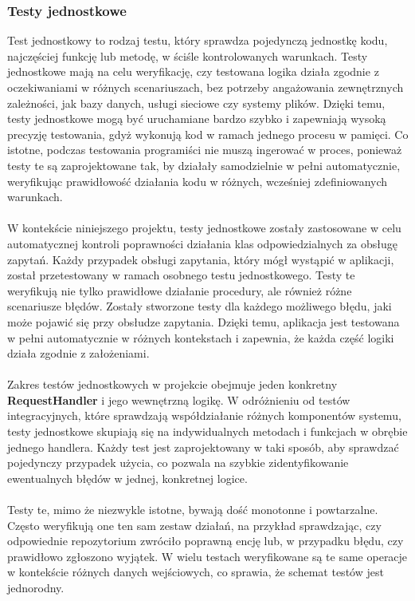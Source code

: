 \documentclass[12pt,a4paper]{article}
\begin{document}
\subsubsection{Testy jednostkowe}
Test jednostkowy to rodzaj testu, który sprawdza pojedynczą jednostkę kodu, najczęściej funkcję lub metodę, w ściśle kontrolowanych warunkach. Testy jednostkowe mają na celu weryfikację, czy testowana logika działa zgodnie z oczekiwaniami w różnych scenariuszach, bez potrzeby angażowania zewnętrznych zależności, jak bazy danych, usługi sieciowe czy systemy plików. Dzięki temu, testy jednostkowe mogą być uruchamiane bardzo szybko i zapewniają wysoką precyzję testowania, gdyż wykonują kod w ramach jednego procesu w pamięci. Co istotne, podczas testowania programiści nie muszą ingerować w proces, ponieważ testy te są zaprojektowane tak, by działały samodzielnie w pełni automatycznie, weryfikując prawidłowość działania kodu w różnych, wcześniej zdefiniowanych warunkach.
\\\\
W kontekście niniejszego projektu, testy jednostkowe zostały zastosowane w celu automatycznej kontroli poprawności działania klas odpowiedzialnych za obsługę zapytań. Każdy przypadek obsługi zapytania, który mógł wystąpić w aplikacji, został przetestowany w ramach osobnego testu jednostkowego. Testy te weryfikują nie tylko prawidłowe działanie procedury, ale również różne scenariusze błędów. Zostały stworzone testy dla każdego możliwego błędu, jaki może pojawić się przy obsłudze zapytania. Dzięki temu, aplikacja jest testowana w pełni automatycznie w różnych kontekstach i zapewnia, że każda część logiki działa zgodnie z założeniami.
\\\\
Zakres testów jednostkowych w projekcie obejmuje jeden konkretny \textbf{RequestHandler} i jego wewnętrzną logikę. W odróżnieniu od testów integracyjnych, które sprawdzają współdziałanie różnych komponentów systemu, testy jednostkowe skupiają się na indywidualnych metodach i funkcjach w obrębie jednego handlera. Każdy test jest zaprojektowany w taki sposób, aby sprawdzać pojedynczy przypadek użycia, co pozwala na szybkie zidentyfikowanie ewentualnych błędów w jednej, konkretnej logice.
\\\\
Testy te, mimo że niezwykle istotne, bywają dość monotonne i powtarzalne. Często weryfikują one ten sam zestaw działań, na przykład sprawdzając, czy odpowiednie repozytorium zwróciło poprawną encję lub, w przypadku błędu, czy prawidłowo zgłoszono wyjątek. W wielu testach weryfikowane są te same operacje w kontekście różnych danych wejściowych, co sprawia, że schemat testów jest jednorodny.
\end{document}

